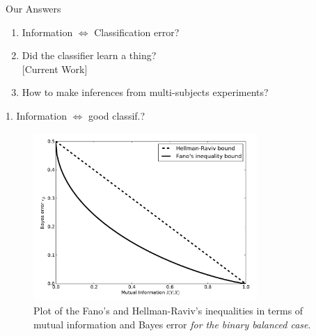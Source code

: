 \documentclass{beamer}
\begin{document}
\begin{frame}{Our Answers}
  \begin{enumerate}
  \item Information $\Longleftrightarrow$ Classification error?\\
    \cite{olivetti2011testing}
  \item Did the classifier learn a thing? \\ 
    $[$Current Work$]$
  \item How to make inferences from multi-subjects experiments? \\
    \cite{olivetti2011bayesian}
  \end{enumerate}
\end{frame}


\begin{frame}{1. Information $\Leftrightarrow$ good classif.?~\cite{olivetti2011testing}}
  \begin{figure}
    \centering
    \includegraphics[width=8.5cm]{mi_be_bounds}
    \caption{Plot of the Fano's and Hellman-Raviv's inequalities in
      terms of mutual information and Bayes error \emph{for the binary
        balanced case}.}
    \label{fig:information_bayes_error_bounds}
  \end{figure}
\end{frame}
\end{document}
